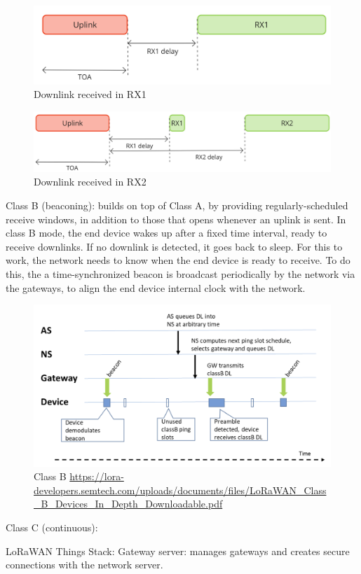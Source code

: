 \begin{figure}[H]
    \centering
    \includegraphics[width=0.5\linewidth]{figures/ClassA_2.jpg}
    \caption{Downlink received in RX1}
    \label{fig:ClassA-RX1}
\end{figure}

\begin{figure}[H]
    \centering
    \includegraphics[width=0.5\linewidth]{figures/ClassA_3.jpg}
    \caption{Downlink received in RX2}
    \label{fig:ClassA-RX2}
\end{figure}

Class B (beaconing): builds on top of Class A, by providing regularly-scheduled receive windows, in addition to those that opens whenever an uplink is sent.
In class B mode, the end device wakes up after a fixed time interval, ready to receive downlinks. If no downlink is detected, it goes back to sleep. For this to work, the network needs to know when the end device is ready to receive. To do this, the a time-synchronized beacon is broadcast periodically by the network via the gateways, to align the end device internal clock with the network.

\begin{figure}
    \centering
    \includegraphics[width=0.5\linewidth]{figures/class_B.png}
    \caption{Class B \url{https://lora-developers.semtech.com/uploads/documents/files/LoRaWAN_Class_B_Devices_In_Depth_Downloadable.pdf}}
    \label{fig:Class_B}
\end{figure}

Class C (continuous):


\ac{LoRaWAN} Things Stack:
Gateway server:
manages gateways and creates secure connections with the network server.

